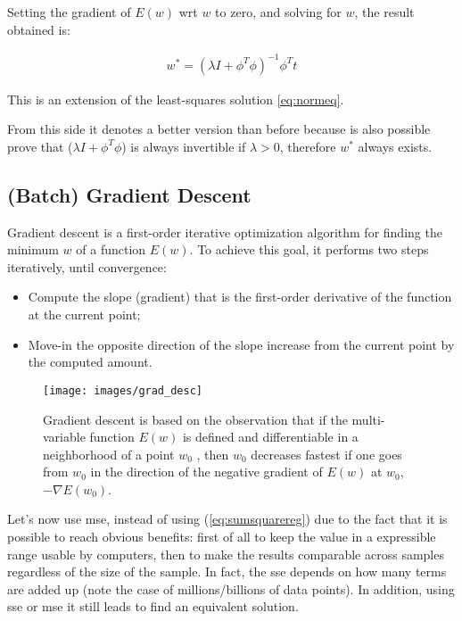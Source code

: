 \noindent Setting the gradient of $E(w)$ \gls{wrt} $w$ to zero, and solving for $w$, the result obtained is:

\begin{Equation}[H]
	\centering
		\begin{equation} \label{eq:least-square-stepf}
			\begin{aligned}
				w^* = (\lambda I + \phi^T \phi)^{-1} \phi^T t
			\end{aligned}
		\end{equation}
		\caption[Ridge regression solution]{This is an extension of the least-squares solution \ref{eq:normeq}.}
\end{Equation}

\noindent From this side it denotes a better version than before because is also possible prove that ($\lambda I + \phi^T \phi$) is always invertible if $\lambda > 0$, therefore $w^*$ always exists.

\subsection{(Batch) Gradient Descent}
\label{subsec:batchgradientdescen}
\noindent Gradient descent is a first-order iterative optimization algorithm for finding the minimum $w$ of a function $E(w)$. To achieve this goal, it performs two steps iteratively, until convergence:

\begin{itemize}
	\item Compute the slope (gradient) that is the first-order derivative of the function at the current point;
	\item Move-in the opposite direction of the slope increase from the current point by the computed amount.
\end{itemize}

\begin{figure}[H]
	\centering
	\texttt{[image: images/grad\_desc]}
	\caption[Gradient descent.]{Gradient descent is based on the observation that if the multi-variable function $E(w)$ is defined and differentiable in a neighborhood of a point $w_0$ , then $w_0$ decreases fastest if one goes from $w_0$  in the direction of the negative gradient of $E(w)$ at $w_0$, $-\nabla E(w_0)$.}
	\label{fig:grad_desc}
\end{figure}

\noindent Let's now use \gls{mse}, instead of using (\ref{eq:sumsquarereg}) due to the fact that it is possible to reach obvious benefits: first of all to keep the value in a expressible range usable by computers, then to make the results comparable across samples regardless of the size of the sample. In fact, the \gls{sse} depends on how many terms are added up (note the case of millions/billions of data points). In addition, using \gls{sse} or \gls{mse} it still leads to find an equivalent solution.

